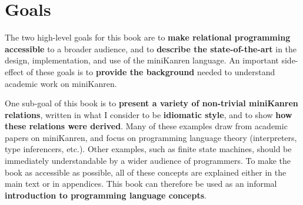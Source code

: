 


\section{Goals}\label{sec:preface:goals}


The two high-level goals for this book are to {\bf make relational programming
accessible} to a broader audience, and to {\bf describe the state-of-the-art}
in the design, implementation, and use of the miniKanren language.
%
An important side-effect of these goals is to {\bf provide the background}
needed to understand academic work on miniKanren.

One sub-goal of this book is to {\bf present a variety of non-trivial
  miniKanren relations}, written in what I consider to be {\bf
  idiomatic style}, and to show {\bf how these relations were
  derived}.
%
Many of these examples draw from academic papers on miniKanren, and
focus on programming language theory (interpreters, type inferencers,
etc.).
%
Other examples, such as finite state machines, should be immediately
understandable by a wider audience of programmers.
%
To make the book as accessible as possible, all of these concepts are
explained either in the main text or in appendices.
%
This book can therefore be used as an informal {\bf introduction to
  programming language concepts}.



